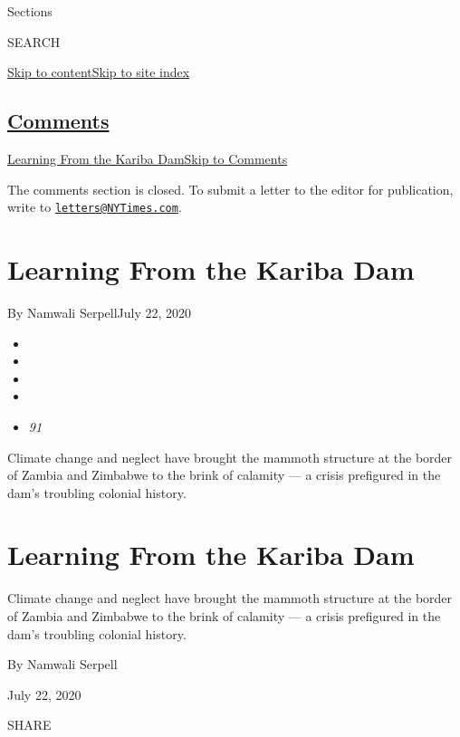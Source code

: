 Sections

SEARCH

\protect\hyperlink{site-content}{Skip to
content}\protect\hyperlink{site-index}{Skip to site index}

\hypertarget{comments}{%
\subsection{\texorpdfstring{\protect\hyperlink{commentsContainer}{Comments}}{Comments}}\label{comments}}

\href{}{Learning From the Kariba Dam}\href{}{Skip to Comments}

The comments section is closed. To submit a letter to the editor for
publication, write to
\href{mailto:letters@NYTimes.com}{\nolinkurl{letters@NYTimes.com}}.

\hypertarget{learning-from-the-kariba-dam}{%
\section{Learning From the Kariba
Dam}\label{learning-from-the-kariba-dam}}

By Namwali SerpellJuly 22, 2020

\begin{itemize}
\item
\item
\item
\item
\item
  \emph{91}
\end{itemize}

Climate change and neglect have brought the mammoth structure at the
border of Zambia and Zimbabwe to the brink of calamity --- a crisis
prefigured in the dam's troubling colonial history.

\hypertarget{learning-from-the-kariba-dam-1}{%
\section{Learning From the Kariba
Dam}\label{learning-from-the-kariba-dam-1}}

Climate change and neglect have brought the mammoth structure at the
border of Zambia and Zimbabwe to the brink of calamity --- a crisis
prefigured in the dam's troubling colonial history.

By Namwali Serpell

July 22, 2020

SHARE


